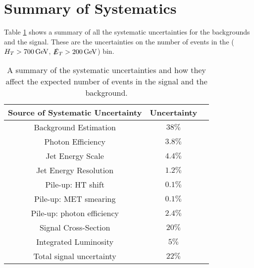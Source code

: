 \section{Summary of Systematics}

Table \ref{tab:Systematics_Summary} shows a summary of all the systematic
uncertainties for the backgrounds and the signal. These are the uncertainties on
the number of events in the ($H_{T}>700\, \mathrm{GeV}$, $\slashed{E}_{T}>200\, \mathrm{GeV}$) bin.

\begin{table}
\begin{center}
\begin{tabular}{|c|c|c|}
\hline
{\bf Source of Systematic Uncertainty} & {\bf Uncertainty} \\
\hline
\hline
Background Estimation & $38\unit{\%}$ \\
\hline
\hline
Photon Efficiency & $3.8\unit{\%}$ \\
\hline
Jet Energy Scale & $4.4\unit{\%}$ \\
\hline
Jet Energy Resolution & $1.2\unit{\%}$ \\
\hline
Pile-up: HT shift & $0.1\unit{\%}$ \\
\hline
Pile-up: MET smearing & $0.1\unit{\%}$ \\
\hline
Pile-up: photon efficiency & $2.4\unit{\%}$ \\
\hline
Signal Cross-Section & $20\unit{\%}$ \\
\hline
Integrated Luminosity & $5\unit{\%}$ \\
\hline
\hline
Total signal uncertainty & $22\unit{\%}$ \\
\hline 
\end{tabular}
\end{center}
\caption{A summary of the systematic uncertainties and how they affect the
expected number of events in the signal and the background.}
\label{tab:Systematics_Summary}
\end{table}
